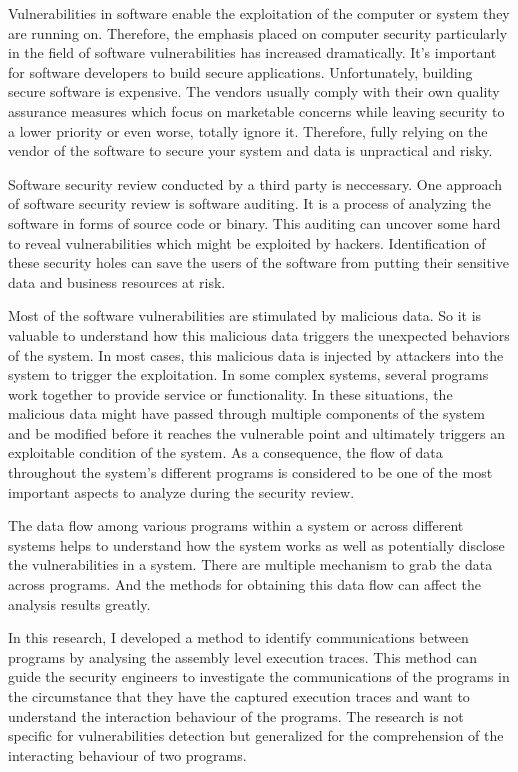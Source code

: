 \label{chapter:introduction}
Vulnerabilities in software enable the exploitation of the computer or system they are running on. Therefore, the emphasis placed on computer security particularly in the field of software vulnerabilities has increased dramatically. It's important for software developers to build secure applications. Unfortunately, building secure software is expensive. The vendors usually comply with their own quality assurance measures which focus on marketable concerns while leaving security to a lower priority or even worse, totally ignore it. Therefore, fully relying on the vendor of the software to secure your system and data is unpractical and risky.\cite{dowd_art_2006}

Software security review conducted by a third party is neccessary. One approach of software security review is software auditing. It is a process of analyzing the software in forms of source code or binary. This auditing can uncover some hard to reveal vulnerabilities which might be exploited by hackers. Identification of these security holes can save the users of the software from putting their sensitive data and business resources at risk.\cite{dowd_art_2006}

Most of the software vulnerabilities are stimulated by malicious data. So it is valuable to understand how this malicious data triggers the unexpected behaviors of the system. In most cases, this malicious data is injected by attackers into the system to trigger the exploitation. In some complex systems, several programs work together to provide service or functionality. In these situations, the malicious data might have passed through multiple components of the system and be modified before it reaches the vulnerable point and ultimately triggers an exploitable condition of the system. As a consequence, the flow of data throughout the system's different programs is considered to be one of the most important aspects to analyze during the security review.\cite{dowd_art_2006}

The data flow among various programs within a system or across different systems helps to understand how the system works as well as potentially disclose the vulnerabilities in a system. There are multiple mechanism to grab the data across programs. And the methods for obtaining this data flow can affect the analysis results greatly. 

In this research, I developed a method to identify communications between programs by analysing the assembly level execution traces. This method can guide the security engineers to investigate the communications of the programs in the circumstance that they have the captured execution traces and want to understand the interaction behaviour of the programs. The research is not specific for vulnerabilities detection but generalized for the comprehension of the interacting behaviour of two programs.

